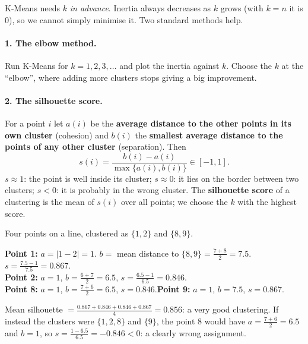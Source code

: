 K-Means needs $k$ \emph{in advance}. Inertia always decreases as $k$ grows (with $k=n$ it is $0$), so we cannot simply minimise it. Two standard methods help.

\paragraph{1. The elbow method.} Run K-Means for $k=1,2,3,\dots$ and plot the inertia against $k$. Choose the $k$ at the ``elbow'', where adding more clusters stops giving a big improvement.

\paragraph{2. The silhouette score.}

\begin{definition}
For a point $i$ let $a(i)$ be the \textbf{average distance to the other points in its own cluster} (cohesion) and $b(i)$ the \textbf{smallest average distance to the points of any other cluster} (separation). Then
\[
  s(i)=\frac{b(i)-a(i)}{\max\{a(i),b(i)\}}\in[-1,1].
\]
$s\approx1$: the point is well inside its cluster; $s\approx0$: it lies on the border between two clusters; $s<0$: it is probably in the wrong cluster. The \textbf{silhouette score} of a clustering is the mean of $s(i)$ over all points; we choose the $k$ with the highest score.
\end{definition}

\begin{example}
Four points on a line, clustered as $\{1,2\}$ and $\{8,9\}$.

\medskip
\textbf{Point 1:} $a=|1-2|=1$. $b=$ mean distance to $\{8,9\}=\frac{7+8}{2}=7.5$. $s=\frac{7.5-1}{7.5}=0.867$.\\
\textbf{Point 2:} $a=1$, $b=\frac{6+7}{2}=6.5$, $s=\frac{6.5-1}{6.5}=0.846$.\\
\textbf{Point 8:} $a=1$, $b=\frac{7+6}{2}=6.5$, $s=0.846$.\quad \textbf{Point 9:} $a=1$, $b=7.5$, $s=0.867$.

\medskip
Mean silhouette $=\frac{0.867+0.846+0.846+0.867}{4}=\mathbf{0.856}$: a very good clustering. If instead the clusters were $\{1,2,8\}$ and $\{9\}$, the point $8$ would have $a=\frac{7+6}2=6.5$ and $b=1$, so $s=\frac{1-6.5}{6.5}=-0.846<0$: a clearly wrong assignment.
\end{example}

